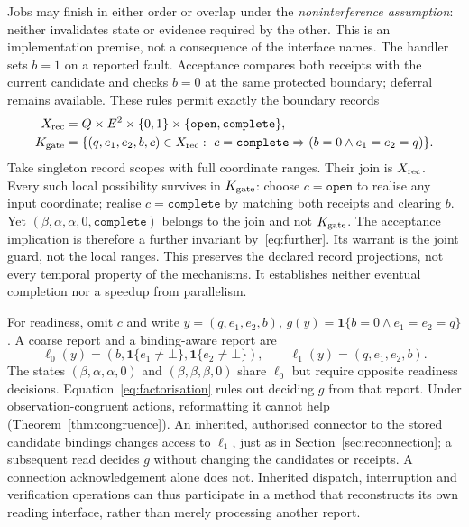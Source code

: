 \documentclass[11pt]{article}
\newcommand{\ind}{\mathbf 1}
\begin{document}
Jobs may finish in either order or overlap under the \emph{noninterference assumption}: neither invalidates state or evidence required by the other. This is an implementation premise, not a consequence of the interface names. The handler sets $b=1$ on a reported fault. Acceptance compares both receipts with the current candidate and checks $b=0$ at the same protected boundary; deferral remains available. These rules permit exactly the boundary records
\begin{equation}\label{eq:workflow}
\begin{split}
X_{\rm rec}&=Q\times E^2\times\{0,1\}\times\{\mathtt{open},\mathtt{complete}\},\\
K_{\rm gate}&=\{(q,e_1,e_2,b,c)\in X_{\rm rec}:\ c=\mathtt{complete}\Rightarrow(b=0\land e_1=e_2=q)\}.
\end{split}
\end{equation}
Take singleton record scopes with full coordinate ranges. Their join is $X_{\rm rec}$. Every such local possibility survives in $K_{\rm gate}$: choose $c=\mathtt{open}$ to realise any input coordinate; realise $c=\mathtt{complete}$ by matching both receipts and clearing $b$. Yet $(\beta,\alpha,\alpha,0,\mathtt{complete})$ belongs to the join and not $K_{\rm gate}$. The acceptance implication is therefore a further invariant by~\eqref{eq:further}. Its warrant is the joint guard, not the local ranges. This preserves the declared record projections, not every temporal property of the mechanisms. It establishes neither eventual completion nor a speedup from parallelism.

For readiness, omit $c$ and write $y=(q,e_1,e_2,b)$, $g(y)=\ind\{b=0\land e_1=e_2=q\}$. A coarse report and a binding-aware report are
\begin{equation}\label{eq:workflowaccess}
\ell_0(y)=(b,\ind\{e_1\ne\bot\},\ind\{e_2\ne\bot\}),\qquad
\ell_1(y)=(q,e_1,e_2,b).
\end{equation}
The states $(\beta,\alpha,\alpha,0)$ and $(\beta,\beta,\beta,0)$ share $\ell_0$ but require opposite readiness decisions. Equation~\eqref{eq:factorisation} rules out deciding $g$ from that report. Under observation-congruent actions, reformatting it cannot help (Theorem~\ref{thm:congruence}). An inherited, authorised connector to the stored candidate bindings changes access to $\ell_1$, just as in Section~\ref{sec:reconnection}; a subsequent read decides $g$ without changing the candidates or receipts. A connection acknowledgement alone does not. Inherited dispatch, interruption and verification operations can thus participate in a method that reconstructs its own reading interface, rather than merely processing another report.
\end{document}
